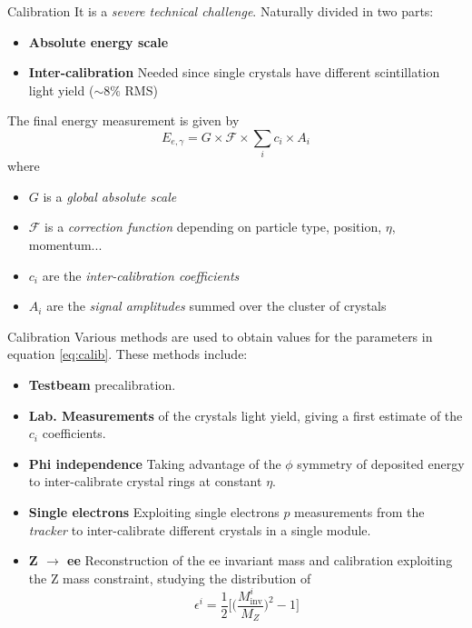 \documentclass[10pt]{beamer}
\begin{document}
\begin{frame}{Calibration}
    It is a \emph{severe technical challenge}.
    Naturally divided in two parts:
    \begin{itemize}
        \item \textbf{Absolute energy scale}
        \item \textbf{Inter-calibration} Needed since single crystals have different scintillation light yield ($\sim 8\%$ RMS)
    \end{itemize}
    The final energy measurement is given by
    \begin{equation}
        E_{e,\gamma} = G \times \mathcal{F} \times \sum_i c_i \times A_i
    \label{eq:calib}
    \end{equation}
    where
    \begin{itemize}
        \item $G$ is a \emph{global absolute scale}
        \item $\mathcal{F}$ is a \emph{correction function} depending on particle type, position, $\eta$, momentum...
        \item $c_i$ are the \emph{inter-calibration coefficients}
        \item $A_i$ are the \emph{signal amplitudes} summed over the cluster of crystals 
    \end{itemize}{}
    
\end{frame}

\begin{frame}{Calibration}
    Various methods are used to obtain values for the parameters in equation \eqref{eq:calib}. These methods include:
    
    \begin{itemize}
        \item \textbf{Testbeam} precalibration.
        \item \textbf{Lab. Measurements} of the crystals light yield, giving a first estimate of the $c_i$ coefficients.
        \item \textbf{Phi independence} Taking advantage of the $\phi$ symmetry of deposited energy to inter-calibrate crystal rings at constant $\eta$.
        \item \textbf{Single electrons} Exploiting single electrons $p$ measurements from the \emph{tracker} to inter-calibrate different crystals in a single module.
        \item \textbf{Z $\rightarrow$ ee} Reconstruction of the ee invariant mass and calibration exploiting the Z mass constraint, studying the distribution of 
        \begin{equation}
            \epsilon^i = \frac{1}{2} \biggl[\biggl(\frac{M^i_\text{inv}}{M_Z}\biggr)^2 - 1\biggr]
        \end{equation}
    \end{itemize}
    
\end{frame}
\end{document}
